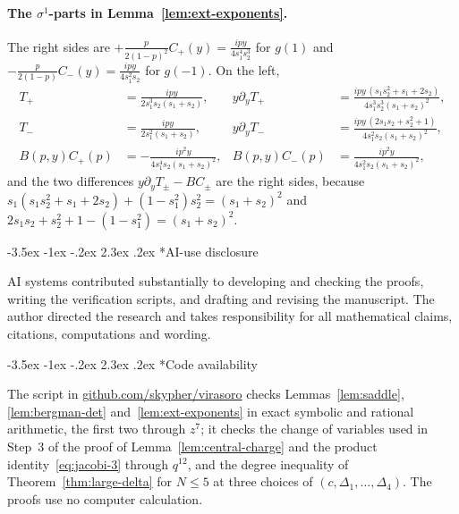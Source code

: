 \documentclass[twoside,10pt]{article}
\makeatletter
\numberwithin{equation}{section}
\theoremstyle{slbody}
\theoremstyle{definition}
\theoremstyle{remark}
\renewcommand{\section}{%
  \@startsection{section}{1}{\z@}%
    {-3.5ex \@plus -1ex \@minus -.2ex}%
    {2.3ex \@plus .2ex}%
    {\normalfont\large\bfseries}}
\makeatother
\begin{document}
\paragraph{The \(\sigma^1\)-parts in Lemma~\ref{lem:ext-exponents}.}
The right sides are \(+\frac{p}{2(1-p)^2}C_+(y)=\frac{ipy}{4s_1^4s_2^3}\) for
\(g(1)\) and \(-\frac{p}{2(1-p)}C_-(y)=\frac{ipy}{4s_1^2s_2}\) for \(g(-1)\).
On the left,
\begin{align*}
 T_+&=\frac{ipy}{2s_1^3s_2(s_1+s_2)},&
 y\partial_yT_+&=\frac{ipy\,(s_1s_2^2+s_1+2s_2)}{4s_1^3s_2^3(s_1+s_2)^2},\\
 T_-&=\frac{ipy}{2s_1^2(s_1+s_2)},&
 y\partial_yT_-&=\frac{ipy\,(2s_1s_2+s_2^2+1)}{4s_1^2s_2(s_1+s_2)^2},\\
 B(p,y)C_+(p)&=-\frac{ip^2y}{4s_1^4s_2(s_1+s_2)^2},&
 B(p,y)C_-(p)&=\frac{ip^2y}{4s_1^2s_2(s_1+s_2)^2},
\end{align*}
and the two differences \(y\partial_yT_\pm-BC_\pm\) are the right sides,
because \(s_1(s_1s_2^2+s_1+2s_2)+(1-s_1^2)s_2^2=(s_1+s_2)^2\) and
\(2s_1s_2+s_2^2+1-(1-s_1^2)=(s_1+s_2)^2\).

\section*{AI-use disclosure}

AI systems contributed substantially to developing and checking the
proofs, writing the verification scripts, and drafting and revising the
manuscript. The author directed the research and takes responsibility
for all mathematical claims, citations, computations and wording.

\section*{Code availability}

The script  in
\href{https://github.com/skypher/virasoro}{github.com/skypher/virasoro}
checks Lemmas~\ref{lem:saddle}, \ref{lem:bergman-det}
and~\ref{lem:ext-exponents} in exact symbolic and rational arithmetic, the
first two through \(z^7\); it checks the change of variables used in Step~3
of the proof of Lemma~\ref{lem:central-charge} and the product
identity~\eqref{eq:jacobi-3} through \(q^{12}\), and the degree inequality of
Theorem~\ref{thm:large-delta} for \(N\leq5\) at three choices of
\((c,\Delta_1,\dots,\Delta_4)\).  The proofs use no computer calculation.
\end{document}
